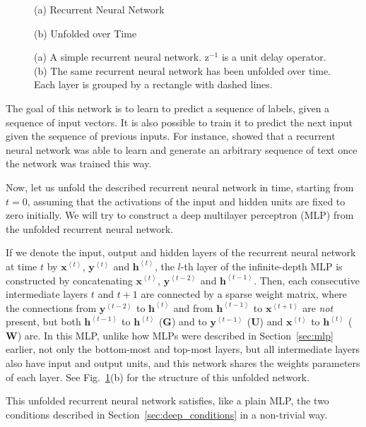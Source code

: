\documentclass[dissertation,nocontribution,draft*]{aaltoseries}
\newcommand{\qt}[1]{\left<#1\right>}
\newcommand{\vect}[1]{\mathbf{#1}}
\newcommand{\matr}[1]{\mathbf{#1}}
\newcommand{\vh}[0]{\vect{h}}
\newcommand{\vx}[0]{\vect{x}}
\newcommand{\vy}[0]{\vect{y}}
\newcommand{\mW}[0]{\matr{W}}
\newcommand{\mG}[0]{\matr{G}}
\newcommand{\mU}[0]{\matr{U}}
\begin{document}
\begin{figure}[t]
    \vspace{2mm}
    \begin{minipage}{0.48\textwidth}
        \centering
        \small
        (a) Recurrent Neural Network
    \end{minipage}
    \begin{minipage}{0.48\textwidth}
        \centering
        \small
        (b) Unfolded over Time
    \end{minipage}
    \caption{(a) A simple recurrent neural network.
    $\text{z}^{-1}$ is a unit delay operator. (b) The same
    recurrent neural network has been unfolded over time.
    Each layer is grouped by a rectangle with dashed lines.}
    \label{fig:rnn}
\end{figure}

The goal of this network is to learn to predict a sequence
of labels, given a sequence of input vectors. It is also
possible to train it to predict the next input given the
sequence of previous inputs. For instance,
\citet{Sutskever2011} showed that a recurrent neural network
was able to learn and generate an arbitrary sequence of text
once the network was trained this way.

Now, let us unfold the described recurrent neural network in
time, starting from $t = 0$, assuming that the
activations of the input and hidden units are fixed to zero
initially. We will try to construct a deep
multilayer perceptron (MLP) from the unfolded recurrent
neural network.

If we denote the input, output and hidden layers of the
recurrent neural network at time $t$ by $\vx^{\qt{t}}$,
$\vy^{\qt{t}}$ and
$\vh^{\qt{t}}$, the $l$-th layer of the infinite-depth MLP is
constructed by concatenating $\vx^{\qt{t}}$, $\vy^{\qt{t-2}}$ and
$\vh^{\qt{t-1}}$. Then, each consecutive intermediate layers $t$
and $t+1$ are connected by a sparse weight matrix, where the
connections from $\vy^{\qt{t-2}}$ to $\vh^{\qt{t}}$ and from
$\vh^{\qt{t-1}}$ to $\vx^{\qt{t+1}}$ are \textit{not} present, but
both $\vh^{\qt{t-1}}$ to $\vh^{\qt{t}}$ ($\mG$) and to
$\vy^{\qt{t-1}}$
($\mU$) and $\vx^{\qt{t}}$ to $\vh^{\qt{t}}$ ($\mW$) are. In this MLP,
unlike how MLPs were described in Section~\ref{sec:mlp}
earlier, not only the bottom-most and top-most layers, but
all intermediate layers also have input and output units,
and this network shares the weights parameters of each
layer.  See Fig.~\ref{fig:rnn}(b) for the structure of this
unfolded network.

This unfolded recurrent neural network satisfies, like a
plain MLP, the two conditions described in
Section~\ref{sec:deep_conditions} in a non-trivial way. 
\end{document}
